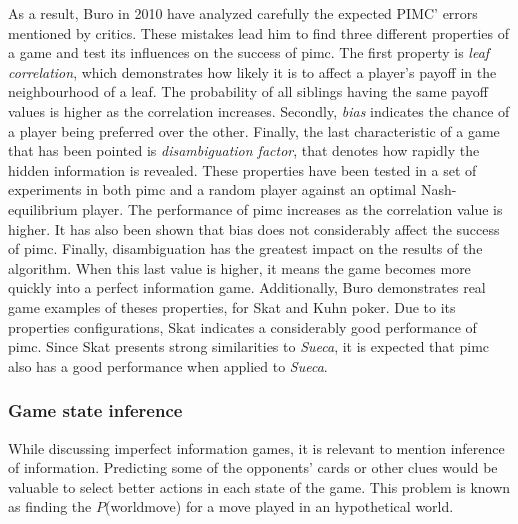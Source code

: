 As a result, Buro in 2010 have analyzed carefully the expected PIMC' errors mentioned by critics.
These mistakes lead him to find three different properties of a game and test its influences on the success of \gls{pimc}.
The first property is \emph{leaf correlation}, which demonstrates how likely it is to affect a player's payoff in the neighbourhood of a leaf.
The probability of all siblings having the same payoff values is higher as the correlation increases.
Secondly, \emph{bias} indicates the chance of a player being preferred over the other.
Finally, the last characteristic of a game that has been pointed is \emph{disambiguation factor}, that denotes how rapidly the hidden information is revealed.
These properties have been tested in a set of experiments in both \gls{pimc} and a random player against an optimal Nash-equilibrium player.
The performance of \gls{pimc} increases as the correlation value is higher.
It has also been shown that bias does not considerably affect the success of \gls{pimc}.
Finally, disambiguation has the greatest impact on the results of the algorithm.
When this last value is higher, it means the game becomes more quickly into a perfect information game.
Additionally, Buro demonstrates real game examples of theses properties, for Skat and Kuhn poker.
Due to its properties configurations, Skat indicates a considerably good performance of \gls{pimc}.
Since Skat presents strong similarities to \emph{Sueca}, it is expected that \gls{pimc} also has a good performance when applied to \emph{Sueca}.



\subsubsection{Game state inference}


While discussing imperfect information games, it is relevant to mention inference of information.
Predicting some of the opponents' cards or other clues would be valuable to select better actions in each state of the game.
This problem is known as finding the $P$(world\textbar move) for a move played in an hypothetical world.


